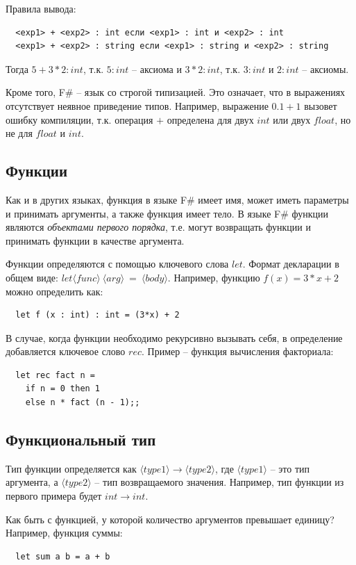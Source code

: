 \documentclass[a4paper,11pt]{article}
\begin{document}
Правила вывода:
\begin{lstlisting}
  <exp1> + <exp2> : int если <exp1> : int и <exp2> : int
  <exp1> + <exp2> : string если <exp1> : string и <exp2> : string
\end{lstlisting}

Тогда $5 + 3 * 2 : int$, т.к. $5 : int$ -- аксиома и $3 * 2 : int$, т.к.
$3 : int$ и $2 : int$ -- аксиомы.

Кроме того, F\# -- язык со строгой типизацией. Это означает, что в выражениях
отсутствует неявное приведение типов. Например, выражение $0.1 + 1$ вызовет
ошибку компиляции, т.к. операция $+$ определена для двух $int$ или двух $float$, но
не для $float$ и $int$.

\subsection{Функции}

Как и в других языках, функция в языке F\# имеет имя, может иметь параметры и 
принимать аргументы, а также функция имеет тело. В языке F\# функции являются
\emph{объектами первого порядка}, т.е. могут возвращать функции и принимать
функции в качестве аргумента.

Функции определяются с помощью ключевого слова $let$. Формат декларации в
общем виде: $let \langle func \rangle~\langle arg \rangle~=~\langle body
\rangle$. Например, функцию $f(x) = 3*x + 2$
можно определить как:
\begin{lstlisting}
  let f (x : int) : int = (3*x) + 2
\end{lstlisting}

В случае, когда функции необходимо рекурсивно вызывать себя, в определение
добавляется ключевое слово $rec$. Пример -- функция вычисления факториала:
\begin{lstlisting}
  let rec fact n =
    if n = 0 then 1
    else n * fact (n - 1);;
\end{lstlisting}

\subsection{Функциональный тип}

Тип функции определяется как $\langle type1 \rangle \rightarrow \langle type2 
\rangle$, где $\langle type1 \rangle$ -- это тип аргумента, а $\langle type2
\rangle$ -- тип возвращаемого значения. Например, тип функции из первого примера
будет $int \rightarrow int$.

Как быть с функцией, у которой количество аргументов превышает единицу? 
Например, функция суммы:
\begin{lstlisting}
  let sum a b = a + b
\end{lstlisting}
\end{document}
